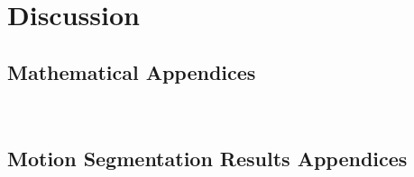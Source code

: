 \documentclass[
  12pt, 
]{book}
\begin{document}
\chapter{Discussion}


\begin{appendices}
  \section{Mathematical Appendices}
~\label{appendix:mathematical}


  \section{Motion Segmentation Results Appendices}
~\label{appendix:moseg_additional_results}
  
\end{appendices}


\end{document}
